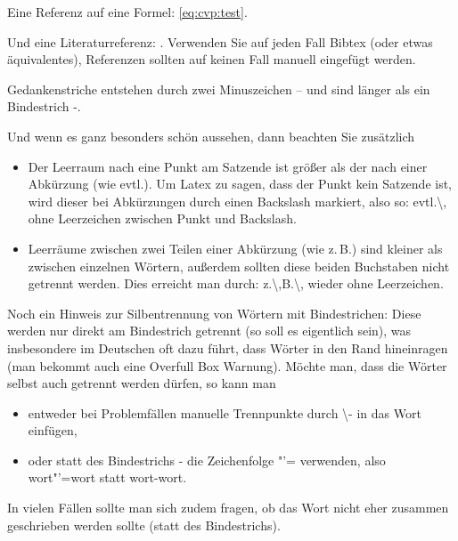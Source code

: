 Eine Referenz auf eine Formel: \eqref{eq:cvp:test}.

Und eine Literaturreferenz: \cite{Auer00:HTF}.
Verwenden Sie auf jeden Fall Bibtex (oder etwas äquivalentes), Referenzen sollten auf keinen Fall manuell eingefügt werden.

Gedankenstriche entstehen durch zwei Minuszeichen -- und sind länger als ein Bindestrich -.

Und wenn es ganz besonders schön aussehen, dann beachten Sie zusätzlich
\begin{itemize}
\item Der Leerraum nach eine Punkt am Satzende ist größer als der nach einer Abkürzung (wie evtl.). 
Um Latex zu sagen, dass der Punkt kein Satzende ist, wird dieser bei Abkürzungen durch einen Backslash markiert, also so: evtl.\textbackslash, ohne Leerzeichen zwischen Punkt und Backslash.

\item
Leerräume zwischen zwei Teilen einer Abkürzung (wie z.\,B.) sind kleiner als zwischen einzelnen Wörtern, außerdem sollten diese beiden Buchstaben nicht getrennt werden. Dies erreicht man durch: z.\textbackslash,B.\textbackslash, wieder ohne Leerzeichen.
\end{itemize}
Noch ein Hinweis zur Silbentrennung von Wörtern mit Bindestrichen: Diese werden nur direkt am Bindestrich getrennt (so soll es eigentlich sein), was insbesondere im Deutschen oft dazu führt, dass Wörter in den Rand hineinragen (man bekommt auch eine Overfull Box Warnung).
Möchte man, dass die Wörter selbst auch getrennt werden dürfen, so kann man
\begin{itemize}
\item
entweder bei Problemfällen manuelle Trennpunkte durch \textbackslash - in das Wort einfügen,
\item oder statt des Bindestrichs - die Zeichenfolge "'= verwenden, also wort"'=wort statt wort-wort.
\end{itemize}
In vielen Fällen sollte man sich zudem fragen, ob das Wort nicht eher zusammen geschrieben werden sollte (statt des Bindestrichs).


